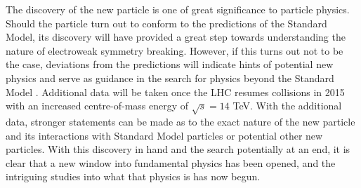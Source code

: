 The discovery of the new particle is one of great significance to particle physics.
Should the particle turn out to conform to the predictions of the Standard Model, 
its discovery will have provided a great step towards understanding the nature of 
electroweak symmetry breaking. However, if this turns out not to be the case, 
deviations from the predictions will indicate hints of potential new physics
and serve as guidance in the search for physics beyond the Standard Model . 
Additional data will be taken once the LHC resumes 
collisions in 2015 with an increased centre-of-mass energy of $\sqrt{s}=14$ TeV. 
With the additional data, stronger statements can be made as to 
the exact nature of the new particle and its interactions with Standard Model particles or potential other new particles. 
With this discovery in hand and the search potentially at an end, 
it is clear that a new window into fundamental physics has been opened, and the intriguing 
studies into what that physics is has now begun.




